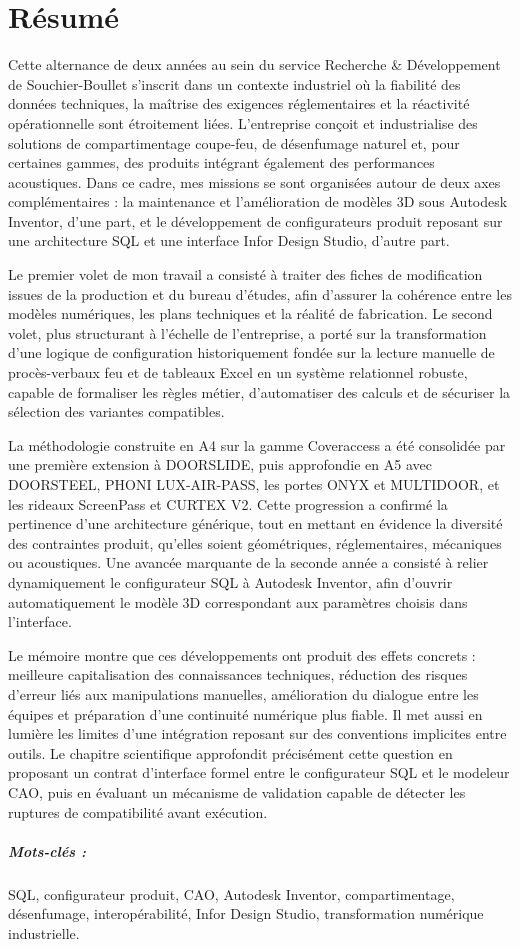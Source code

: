 \chapter*{Résumé}

Cette alternance de deux années au sein du service Recherche \& Développement de Souchier-Boullet s'inscrit dans un contexte industriel où la fiabilité des données techniques, la maîtrise des exigences réglementaires et la réactivité opérationnelle sont étroitement liées. L'entreprise conçoit et industrialise des solutions de compartimentage coupe-feu, de désenfumage naturel et, pour certaines gammes, des produits intégrant également des performances acoustiques. Dans ce cadre, mes missions se sont organisées autour de deux axes complémentaires : la maintenance et l'amélioration de modèles 3D sous Autodesk Inventor, d'une part, et le développement de configurateurs produit reposant sur une architecture SQL et une interface Infor Design Studio, d'autre part.

Le premier volet de mon travail a consisté à traiter des fiches de modification issues de la production et du bureau d'études, afin d'assurer la cohérence entre les modèles numériques, les plans techniques et la réalité de fabrication. Le second volet, plus structurant à l'échelle de l'entreprise, a porté sur la transformation d'une logique de configuration historiquement fondée sur la lecture manuelle de procès-verbaux feu et de tableaux Excel en un système relationnel robuste, capable de formaliser les règles métier, d'automatiser des calculs et de sécuriser la sélection des variantes compatibles.

La méthodologie construite en A4 sur la gamme Coveraccess a été consolidée par une première extension à DOORSLIDE, puis approfondie en A5 avec DOORSTEEL, PHONI LUX-AIR-PASS, les portes ONYX et MULTIDOOR, et les rideaux ScreenPass et CURTEX V2. Cette progression a confirmé la pertinence d'une architecture générique, tout en mettant en évidence la diversité des contraintes produit, qu'elles soient géométriques, réglementaires, mécaniques ou acoustiques. Une avancée marquante de la seconde année a consisté à relier dynamiquement le configurateur SQL à Autodesk Inventor, afin d'ouvrir automatiquement le modèle 3D correspondant aux paramètres choisis dans l'interface.

Le mémoire montre que ces développements ont produit des effets concrets : meilleure capitalisation des connaissances techniques, réduction des risques d'erreur liés aux manipulations manuelles, amélioration du dialogue entre les équipes et préparation d'une continuité numérique plus fiable. Il met aussi en lumière les limites d'une intégration reposant sur des conventions implicites entre outils. Le chapitre scientifique approfondit précisément cette question en proposant un contrat d'interface formel entre le configurateur SQL et le modeleur CAO, puis en évaluant un mécanisme de validation capable de détecter les ruptures de compatibilité avant exécution.

\paragraph{Mots-clés :} SQL, configurateur produit, CAO, Autodesk Inventor, compartimentage, désenfumage, interopérabilité, Infor Design Studio, transformation numérique industrielle.
